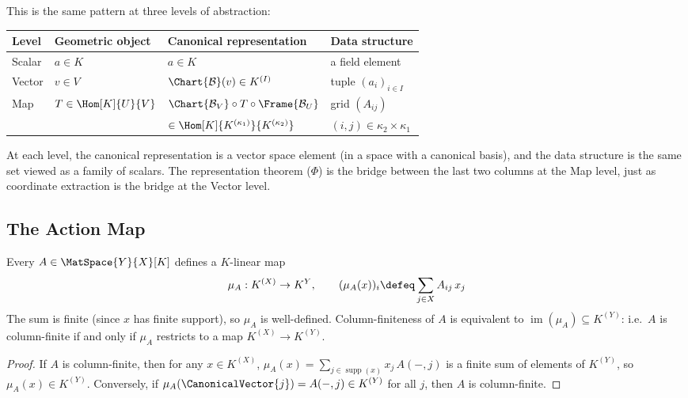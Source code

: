 \begin{remark}
    This is the same pattern at three levels of abstraction:

    \medskip
    \begin{center}
    \begin{tabular}{l|lll}
    \hline
    \textbf{Level} & \textbf{Geometric object} & \textbf{Canonical representation} & \textbf{Data structure} \\
    \hline
    Scalar & $a \in K$ & $a \in K$ & a field element \\[4pt]
    Vector & $v \in V$ & $\Chart{\mathcal{B}}(v) \in K^{(I)}$ & tuple $(a_i)_{i \in I}$ \\[4pt]
    Map & $T \in \Hom[K]{U}{V}$ &
        $\Chart{\mathcal{B}_V} \circ T \circ \Frame{\mathcal{B}_U}$ &
        grid $(A_{ij})$ \\
        & & $\in \Hom[K]{K^{(\kappa_1)}}{K^{(\kappa_2)}}$ &
        $(i,j) \in \kappa_2 \times \kappa_1$ \\
    \hline
    \end{tabular}
    \end{center}
    \medskip

    At each level, the canonical representation is a vector space element (in a space with a
    canonical basis), and the data structure is the same set viewed as a family of scalars.
    The representation theorem ($\Phi$) is the bridge between the last two columns at the Map
    level, just as coordinate extraction is the bridge at the Vector level.
\end{remark}


\subsection{The Action Map}

\begin{proposition}
\label{prop:action-map}
    Every $A \in \MatSpace{Y}{X}[K]$ defines a $K$-linear map
    \[
        \mu_A: K^{(X)} \to K^Y, \qquad
        (\mu_A(x))_i \defeq \sum_{j \in X} A_{ij}\, x_j
    \]
    The sum is finite (since $x$ has finite support), so $\mu_A$ is well-defined.
    Column-finiteness of $A$ is equivalent to
    $\operatorname{im}(\mu_A) \subseteq K^{(Y)}$: i.e.\ $A$ is column-finite if and only if
    $\mu_A$ restricts to a map $K^{(X)} \to K^{(Y)}$.
\end{proposition}

\begin{proof}
    If $A$ is column-finite, then for any $x \in K^{(X)}$,
    $\mu_A(x) = \sum_{j \in \operatorname{supp}(x)} x_j\, A(-,j)$ is a finite sum of
    elements of $K^{(Y)}$, so $\mu_A(x) \in K^{(Y)}$. Conversely, if
    $\mu_A(\CanonicalVector{j}) = A(-,j) \in K^{(Y)}$ for all $j$, then $A$ is column-finite.
\end{proof}

